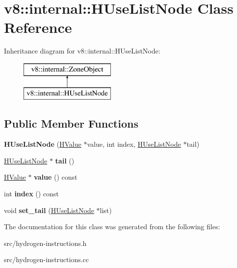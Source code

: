 \hypertarget{classv8_1_1internal_1_1_h_use_list_node}{}\section{v8\+:\+:internal\+:\+:H\+Use\+List\+Node Class Reference}
\label{classv8_1_1internal_1_1_h_use_list_node}
Inheritance diagram for v8\+:\+:internal\+:\+:H\+Use\+List\+Node\+:\begin{figure}[H]
\begin{center}
\leavevmode
\includegraphics[height=2.000000cm]{classv8_1_1internal_1_1_h_use_list_node}
\end{center}
\end{figure}
\subsection*{Public Member Functions}
\begin{DoxyCompactItemize}
\item 
\hypertarget{classv8_1_1internal_1_1_h_use_list_node_a402e6b4e5106b4081069dee981c4813d}{}{\bfseries H\+Use\+List\+Node} (\hyperlink{classv8_1_1internal_1_1_h_value}{H\+Value} $\ast$value, int index, \hyperlink{classv8_1_1internal_1_1_h_use_list_node}{H\+Use\+List\+Node} $\ast$tail)\label{classv8_1_1internal_1_1_h_use_list_node_a402e6b4e5106b4081069dee981c4813d}

\item 
\hypertarget{classv8_1_1internal_1_1_h_use_list_node_a17ad25f823c9b4391cf3c6176b96604a}{}\hyperlink{classv8_1_1internal_1_1_h_use_list_node}{H\+Use\+List\+Node} $\ast$ {\bfseries tail} ()\label{classv8_1_1internal_1_1_h_use_list_node_a17ad25f823c9b4391cf3c6176b96604a}

\item 
\hypertarget{classv8_1_1internal_1_1_h_use_list_node_af95878151f6e452f6af433e3827b1e76}{}\hyperlink{classv8_1_1internal_1_1_h_value}{H\+Value} $\ast$ {\bfseries value} () const \label{classv8_1_1internal_1_1_h_use_list_node_af95878151f6e452f6af433e3827b1e76}

\item 
\hypertarget{classv8_1_1internal_1_1_h_use_list_node_aae5ae3407778866c9ce35d7cb2eaf386}{}int {\bfseries index} () const \label{classv8_1_1internal_1_1_h_use_list_node_aae5ae3407778866c9ce35d7cb2eaf386}

\item 
\hypertarget{classv8_1_1internal_1_1_h_use_list_node_ae889078e1f0421c1df1e9b581aa02277}{}void {\bfseries set\+\_\+tail} (\hyperlink{classv8_1_1internal_1_1_h_use_list_node}{H\+Use\+List\+Node} $\ast$list)\label{classv8_1_1internal_1_1_h_use_list_node_ae889078e1f0421c1df1e9b581aa02277}

\end{DoxyCompactItemize}


The documentation for this class was generated from the following files\+:\begin{DoxyCompactItemize}
\item 
src/hydrogen-\/instructions.\+h\item 
src/hydrogen-\/instructions.\+cc\end{DoxyCompactItemize}
